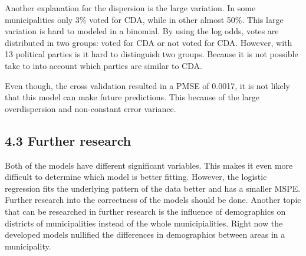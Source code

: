 \documentclass[11pt,]{article}
\begin{document}
Another explanation for the dispersion is the large variation. In some
municipalities only 3\% voted for CDA, while in other almost 50\%. This
large variation is hard to modeled in a binomial. By using the log odds,
votes are distributed in two groups: voted for CDA or not voted for CDA.
However, with 13 political parties is it hard to distinguish two groups.
Because it is not possible take to into account which parties are
similar to CDA.

Even though, the cross validation resulted in a PMSE of 0.0017, it is
not likely that this model can make future predictions. This because of
the large overdispersion and non-constant error variance.

\subsection{4.3 Further research}\label{further-research}

Both of the models have different significant variables. This makes it
even more difficult to determine which model is better fitting. However,
the logistic regression fits the underlying pattern of the data better
and has a smaller MSPE. Further research into the correctness of the
models should be done. Another topic that can be researched in further
research is the influence of demographics on districts of municipalities
instead of the whole municipialities. Right now the developed models
nullified the differences in demographics between areas in a
municipality.
\end{document}
